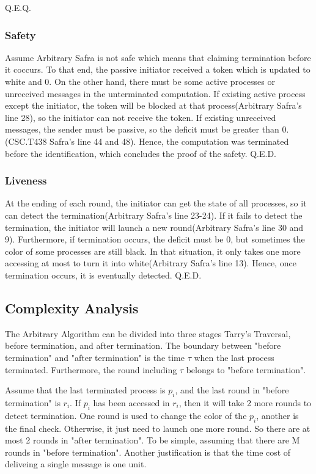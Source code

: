 \documentclass{article}
\begin{document}
Q.E.Q.

\subsubsection{Safety}
Assume Arbitrary Safra is not safe which means that claiming termination before it coccurs.
To that end, the passive initiator received a token which is updated to white and 0.
On the other hand, there must be some active processes or unreceived messages in the unterminated computation.
If existing active process except the initiator, the token will be blocked at that process(Arbitrary Safra's line 28), so the initiator can not receive the token.
If existing unreceived messages, the sender must be passive, so the deficit must be greater than 0.(CSC.T438 Safra's line 44 and 48).
Hence, the computation was terminated before the identification, which concludes the proof of the safety.
Q.E.D.
\subsubsection{Liveness}
At the ending of each round, the initiator can get the state of all processes, so it can detect the termination(Arbitrary Safra's line 23-24). If it fails to detect the termination, the initiator will launch a new round(Arbitrary Safra's line 30 and 9). Furthermore, if termination occurs, the deficit must be 0, but sometimes the color of some processes are still black. In that situation, it only takes one more accessing at most to turn it into white(Arbitrary Safra's line 13). Hence, once termination occurs, it is eventually detected. Q.E.D.

\subsection{Complexity Analysis}
The Arbitrary Algorithm can be divided into three stages Tarry's Traversal, before termination, and after termination.
The boundary between "before termination" and "after termination" is the time $\tau$ when the last process terminated.
Furthermore, the round including $\tau$ belongs to "before termination".

Assume that the last terminated process is $p_i$, and the last round in "before termination" is $r_i$. If $p_i$ has been accessed in $r_i$, then it will take 2 more rounds to detect termination. One round is used to change the color of the $p_i$, another is the final check. Otherwise, it just need to launch one more round. So there are at most 2 rounds in "after termination". To be simple, assuming that there are M rounds in "before termination". Another justification is that the time cost of deliveing a single message is one unit.
\end{document}
